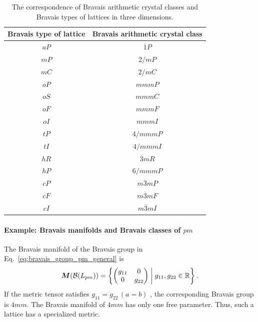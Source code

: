 \begin{table}[htb]
  \centering
  \caption{The correspondence of Bravais arithmetic crystal classes and Bravais types of lattices in three dimensions.}
  \label{table:arithmetic-class-3d}
  \begin{tabular}{cc}
    \hline\hline
    Bravais type of lattice & Bravais arithmetic crystal class \\ \hline
    $aP$                    & $\overline{1}P$                  \\
    $mP$                    & $2/mP$                           \\
    $mC$                    & $2/mC$                           \\
    $oP$                    & $mmmP$                           \\
    $oS$                    & $mmmC$                           \\
    $oF$                    & $mmmF$                           \\
    $oI$                    & $mmmI$                           \\
    $tP$                    & $4/mmmP$                         \\
    $tI$                    & $4/mmmI$                         \\
    $hR$                    & $\overline{3}mR$                 \\
    $hP$                    & $6/mmmP$                         \\
    $cP$                    & $m\overline{3}mP$                \\
    $cF$                    & $m\overline{3}mF$                \\
    $cI$                    & $m\overline{3}mI$                \\
    \hline\hline
  \end{tabular}
\end{table}

\paragraph{Example: Bravais manifolds and Bravais classes of $pm$}

The Bravais manifold of the Bravais group in Eq.~\eqref{eq:bravais_group_pm_general} is
\begin{align*}
  \bm{M}(\mathcal{B}(L_{pm})) = \left\{ 
    \begin{pmatrix} g_{11} & 0 \\ 0 & g_{22} \end{pmatrix}
   \mathrel{}\middle|\mathrel{} 
    g_{11}, g_{22} \in \mathbb{R}
   \right\}.
\end{align*}
If the metric tensor satisfies $g_{11} = g_{22} \, (a = b)$ , the corresponding Bravais group is $4mm$.
The Bravais manifold of $4mm$ has only one free parameter.
Thus, such a lattice has a specialized metric.

